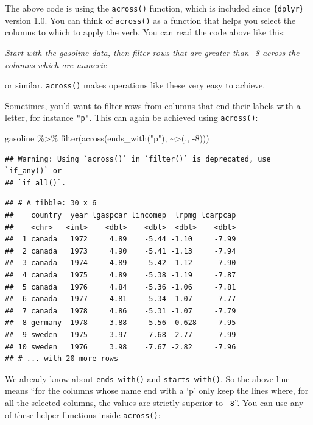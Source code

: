 \documentclass[
]{article}
\newenvironment{Shaded}{\begin{snugshade}}{\end{snugshade}}
\newcommand{\AttributeTok}[1]{\textcolor[rgb]{0.77,0.63,0.00}{#1}}
\newcommand{\DecValTok}[1]{\textcolor[rgb]{0.00,0.00,0.81}{#1}}
\newcommand{\FunctionTok}[1]{\textcolor[rgb]{0.00,0.00,0.00}{#1}}
\newcommand{\NormalTok}[1]{#1}
\newcommand{\SpecialCharTok}[1]{\textcolor[rgb]{0.00,0.00,0.00}{#1}}
\newcommand{\StringTok}[1]{\textcolor[rgb]{0.31,0.60,0.02}{#1}}
\begin{document}
The above code is using the \texttt{across()} function, which is included since \texttt{\{dplyr\}} version 1.0. You
can think of \texttt{across()} as a function that helps you select the columns to which to apply the
verb. You can read the code above like this:

\emph{Start with the gasoline data, then filter rows that are greater than -8 across the columns
which are numeric}

or similar. \texttt{across()} makes operations like these very easy to achieve.

Sometimes, you'd want to filter rows from columns that end their labels with a letter, for instance
\texttt{"p"}. This can again be achieved using \texttt{across()}:

\begin{Shaded}
\begin{Highlighting}[]
\NormalTok{gasoline }\SpecialCharTok{\%\textgreater{}\%}
  \FunctionTok{filter}\NormalTok{(}\FunctionTok{across}\NormalTok{(}\FunctionTok{ends\_with}\NormalTok{(}\StringTok{"p"}\NormalTok{), }\SpecialCharTok{\textasciitilde{}}\StringTok{\textasciigrave{}}\AttributeTok{\textgreater{}}\StringTok{\textasciigrave{}}\NormalTok{(., }\SpecialCharTok{{-}}\DecValTok{8}\NormalTok{)))}
\end{Highlighting}
\end{Shaded}

\begin{verbatim}
## Warning: Using `across()` in `filter()` is deprecated, use `if_any()` or
## `if_all()`.
\end{verbatim}

\begin{verbatim}
## # A tibble: 30 x 6
##    country  year lgaspcar lincomep  lrpmg lcarpcap
##    <chr>   <int>    <dbl>    <dbl>  <dbl>    <dbl>
##  1 canada   1972     4.89    -5.44 -1.10     -7.99
##  2 canada   1973     4.90    -5.41 -1.13     -7.94
##  3 canada   1974     4.89    -5.42 -1.12     -7.90
##  4 canada   1975     4.89    -5.38 -1.19     -7.87
##  5 canada   1976     4.84    -5.36 -1.06     -7.81
##  6 canada   1977     4.81    -5.34 -1.07     -7.77
##  7 canada   1978     4.86    -5.31 -1.07     -7.79
##  8 germany  1978     3.88    -5.56 -0.628    -7.95
##  9 sweden   1975     3.97    -7.68 -2.77     -7.99
## 10 sweden   1976     3.98    -7.67 -2.82     -7.96
## # ... with 20 more rows
\end{verbatim}

We already know about \texttt{ends\_with()} and \texttt{starts\_with()}. So the above line means ``for the columns
whose name end with a `p' only keep the lines where, for all the selected columns, the values are
strictly superior to \texttt{-8}''. You can use any of these helper functions inside \texttt{across()}:
\end{document}
